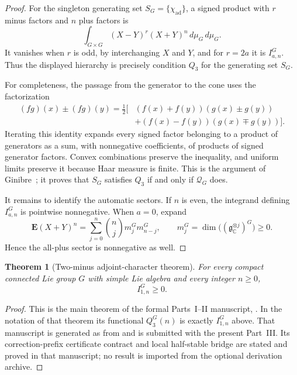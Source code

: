 \documentclass[11pt,reqno]{amsart}
\theoremstyle{plain}
\newtheorem{theorem}{Theorem}[section]
\theoremstyle{definition}
\newcommand{\chiad}{\chi_{\mathrm{ad}}}
\newcommand{\Qcone}{\mathcal Q}
\begin{document}
\begin{proof}
For the singleton generating set $S_G=\{\chiad\}$, a signed product with
$r$ minus factors and $n$ plus factors is
\[
 \int_{G\times G}(X-Y)^r(X+Y)^n\,d\mu_G\,d\mu_G.
\]
It vanishes when $r$ is odd, by interchanging $X$ and $Y$, and for $r=2a$
it is $I^G_{a,n}$.  Thus the displayed hierarchy is precisely condition
$Q_3$ for the generating set $S_G$.

For completeness, the passage from the generator to the cone uses the
factorization
\[
 \begin{aligned}
 (fg)(x)\pm(fg)(y)
 =\frac12\bigl[&(f(x)+f(y))(g(x)\pm g(y))\\
               &+(f(x)-f(y))(g(x)\mp g(y))\bigr].
 \end{aligned}
\]
Iterating this identity expands every signed factor belonging to a product
of generators as a sum, with nonnegative coefficients, of products of
signed generator factors.  Convex combinations preserve the inequality,
and uniform limits preserve it because Haar measure is finite.  This is the
argument of Ginibre~\cite[Proposition~1 and (1.5)]{Ginibre1970}; it proves
that $S_G$ satisfies $Q_3$ if and only if $\Qcone_G$ does.

It remains to identify the automatic sectors.  If $n$ is even, the
integrand defining $I^G_{a,n}$ is pointwise nonnegative.  When $a=0$, expand
\[
 \mathbf E(X+Y)^n
 =\sum_{j=0}^{n}\binom nj m_j^Gm_{n-j}^G,
 \qquad
 m_j^G=\dim\bigl((\mathfrak g_{\mathbb C}^{\otimes j})^G\bigr)\geq0.
\]
Hence the all-plus sector is nonnegative as well.
\end{proof}

\begin{theorem}[Two-minus adjoint-character theorem]
\label{thm:two-minus-import}
For every compact connected Lie group $G$ with simple Lie algebra and every
integer $n\geq0$,
\[
 I^G_{1,n}\geq0.
\]
\end{theorem}

\begin{proof}
This is the main theorem of the formal Parts~I--II manuscript,
\cite[Theorem~2.2]{AdjointTwoMinus}.  In the notation of that theorem its
functional $Q_3^G(n)$ is exactly $I^G_{1,n}$ above.  That manuscript is
generated as  from  and is submitted with the
present Part~III.  Its correction-prefix certificate contract and local
half-stable bridge are stated and proved in that manuscript; no result is
imported from the optional derivation archive.
\end{proof}
\end{document}
